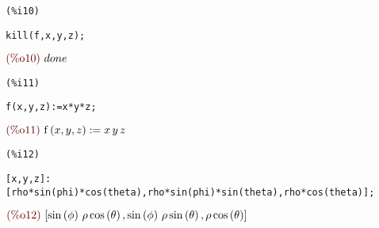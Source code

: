 \documentclass{article}
\begin{document}
\noindent
\begin{minipage}[t]{8ex}{\color{red}\bf
\begin{verbatim}
(%i10) 
\end{verbatim}}
\end{minipage}
\begin{minipage}[t]{\textwidth}{\color{blue}
\begin{verbatim}
kill(f,x,y,z);
\end{verbatim}}
\end{minipage}
\begin{math}\displaystyle
\parbox{8ex}{\color{labelcolor}(\%o10) }
done
\end{math}


\noindent
\begin{minipage}[t]{8ex}{\color{red}\bf
\begin{verbatim}
(%i11) 
\end{verbatim}}
\end{minipage}
\begin{minipage}[t]{\textwidth}{\color{blue}
\begin{verbatim}
f(x,y,z):=x*y*z;
\end{verbatim}}
\end{minipage}
\begin{math}\displaystyle
\parbox{8ex}{\color{labelcolor}(\%o11) }
\mathrm{f}\left( x,y,z\right) :=x\,y\,z
\end{math}


\noindent
\begin{minipage}[t]{8ex}{\color{red}\bf
\begin{verbatim}
(%i12) 
\end{verbatim}}
\end{minipage}
\begin{minipage}[t]{\textwidth}{\color{blue}
\begin{verbatim}
[x,y,z]:[rho*sin(phi)*cos(theta),rho*sin(phi)*sin(theta),rho*cos(theta)];
\end{verbatim}}
\end{minipage}
\begin{math}\displaystyle
\parbox{8ex}{\color{labelcolor}(\%o12) }
[\mathrm{sin}\left( \phi\right) \,\rho\,\mathrm{cos}\left( \theta\right) ,\mathrm{sin}\left( \phi\right) \,\rho\,\mathrm{sin}\left( \theta\right) ,\rho\,\mathrm{cos}\left( \theta\right) ]
\end{math}
\end{document}
